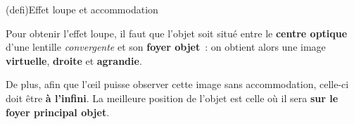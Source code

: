 \documentclass[../../main/main.tex]{subfiles}
\begin{document}
\begin{tcb}[label=def:loupe, valign=center](defi){Effet loupe et accommodation}
	\begin{isd}
		Pour obtenir l'effet loupe, il faut que l'objet soit situé entre le
		\textbf{centre optique} d'une lentille \textit{convergente} et son
		\textbf{foyer objet}~: on obtient alors une image \textbf{virtuelle},
		\textbf{droite} et \textbf{agrandie}.
		\vfill
		\tcblower
		\begin{center}
			\label{loupeavecacc}
		\end{center}
	\end{isd}
	\tcblower
	\begin{isd}
		De plus, afin que l'œil puisse observer cette image sans accommodation,
		celle-ci doit être \textbf{à l'infini}. La meilleure position de l'objet
		est celle où il sera \textbf{sur le foyer principal objet}.
		\tcblower
		\begin{center}

\end{center}
\end{isd}
\end{tcb}
\end{document}
